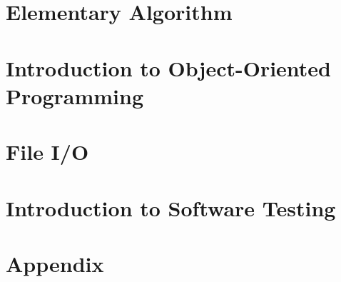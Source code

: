 \documentclass[11pt,titlepage]{book}
\begin{document}
\chapter{Elementary Algorithm}
    
    
    
    
\chapter{Introduction to Object-Oriented Programming}
    
    
    
    
    
    
    
\chapter{File I/O}
    
    
        
    
    
\chapter{Introduction to Software Testing}
    
    

\backmatter
\chapter{Appendix}
    
    
\end{document}
